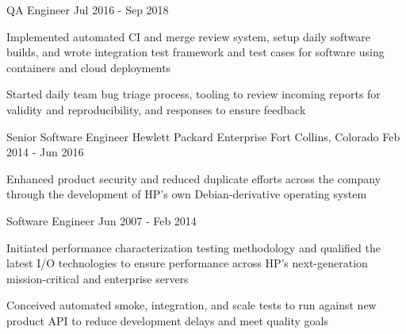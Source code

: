 \begin{cventries}
  \cventry
    {QA Engineer}
    {}
    {}
    {Jul 2016 - Sep 2018}
    {
      \begin{cvitems}
        \item {
          Implemented automated CI and merge review system, setup daily
          software builds, and wrote integration test framework and test
          cases for software using containers and cloud deployments
        }
        \item {
          Started daily team bug triage process, tooling to review
          incoming reports for validity and reproducibility, and responses
          to ensure feedback
        }
      \end{cvitems}
    }
    {}

  \cventry
    {Senior Software Engineer}
    {Hewlett Packard Enterprise}
    {Fort Collins, Colorado}
    {Feb 2014 - Jun 2016}
    {}
    {
      \begin{cvitems}
        \item {
          Enhanced product security and reduced duplicate efforts across the
          company through the development of HP's own Debian-derivative
          operating system
        }
      \end{cvitems}
    }

  \cventry
    {Software Engineer}
    {}
    {}
    {Jun 2007 - Feb 2014}
    {}
    {
      \begin{cvitems}
        \item {
          Initiated performance characterization testing methodology and
          qualified the latest I/O technologies to ensure performance across
          HP’s next-generation mission-critical and enterprise servers
        }
        \item {
          Conceived automated smoke, integration, and scale tests to run
          against new product API to reduce development delays and meet
          quality goals
        }
      \end{cvitems}
    }

\end{cventries}